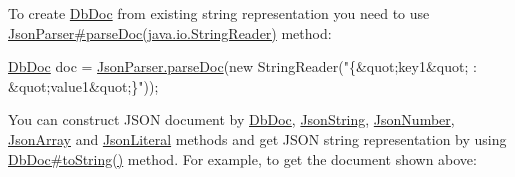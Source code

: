 To create \mbox{\hyperlink{interfacecom_1_1mysql_1_1cj_1_1xdevapi_1_1_db_doc}{Db\+Doc}} from existing string representation you need to use \mbox{\hyperlink{}{Json\+Parser\#parse\+Doc(java.\+io.\+String\+Reader)}} method\+:


\begin{DoxyPre}
\mbox{\hyperlink{interfacecom_1_1mysql_1_1cj_1_1xdevapi_1_1_db_doc}{DbDoc}} doc = \mbox{\hyperlink{classcom_1_1mysql_1_1cj_1_1xdevapi_1_1_json_parser_ad779f7c1563d2bcca7481d3655519501}{JsonParser.parseDoc}}(new StringReader("\{\&quot;key1\&quot; : \&quot;value1\&quot;\}"));
\end{DoxyPre}


You can construct J\+S\+ON document by \mbox{\hyperlink{interfacecom_1_1mysql_1_1cj_1_1xdevapi_1_1_db_doc}{Db\+Doc}}, \mbox{\hyperlink{classcom_1_1mysql_1_1cj_1_1xdevapi_1_1_json_string}{Json\+String}}, \mbox{\hyperlink{classcom_1_1mysql_1_1cj_1_1xdevapi_1_1_json_number}{Json\+Number}}, \mbox{\hyperlink{classcom_1_1mysql_1_1cj_1_1xdevapi_1_1_json_array}{Json\+Array}} and \mbox{\hyperlink{enumcom_1_1mysql_1_1cj_1_1xdevapi_1_1_json_literal}{Json\+Literal}} methods and get J\+S\+ON string representation by using \mbox{\hyperlink{}{Db\+Doc\#to\+String()}} method. For example, to get the document shown above\+:


